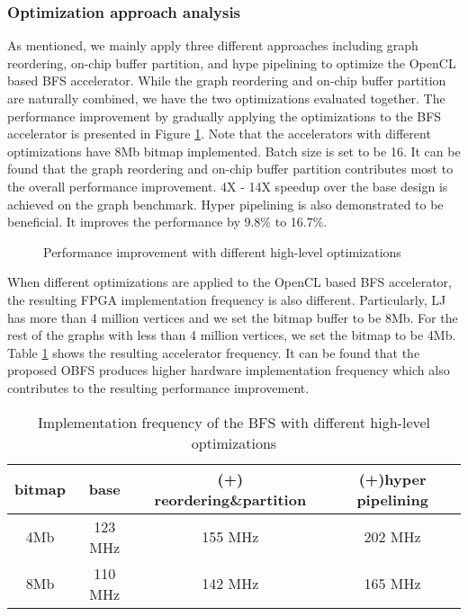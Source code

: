 \subsubsection{Optimization approach analysis}
As mentioned, we mainly apply three different approaches including 
graph reordering, on-chip buffer partition,  
and hype pipelining to optimize the OpenCL based BFS accelerator.
While the graph reordering and on-chip buffer partition are naturally combined, 
we have the two optimizations evaluated together. The performance improvement 
by gradually applying the optimizations to the BFS accelerator is presented 
in Figure \ref{fig:opt-analysis}. Note that the accelerators with different 
optimizations have 8Mb bitmap implemented. Batch size is set to be 16.
It can be found that the graph reordering and on-chip buffer partition 
contributes most to the overall performance improvement. 
4X - 14X speedup over the base design is achieved on the graph benchmark. 
Hyper pipelining is also demonstrated to be beneficial. 
It improves the performance by 9.8\% to 16.7\%. 

 \begin{figure}
	\caption{Performance improvement with different high-level optimizations}
\label{fig:opt-analysis}
\vspace{-1em}
\end{figure}

When different optimizations are applied to the OpenCL based BFS accelerator, 
the resulting FPGA implementation frequency is also different. 
Particularly, LJ has more than 4 million vertices and we set the bitmap buffer to be 8Mb. 
For the rest of the graphs with less than 4 million vertices, we set the bitmap to be 4Mb. 
Table \ref{tab:opt-freq} shows the resulting accelerator frequency. 
It can be found that the proposed OBFS produces higher hardware 
implementation frequency which also contributes to the resulting 
performance improvement. 

\begin{table}
	\vspace{-1em}
  \caption{Implementation frequency of the BFS with different high-level optimizations}
  \label{tab:opt-freq}
    \setlength{\tabcolsep}{4pt} %
	\centering
  \begin{tabular}{cccc}
    \toprule
	bitmap & base & (+) reordering\&partition & (+)hyper pipelining \\
	\midrule
	4Mb & 123 MHz & 155 MHz & 202 MHz\\
	8Mb & 110 MHz & 142 MHz & 165 MHz\\
  \bottomrule
\end{tabular}
\vspace{-1em}
\end{table}


